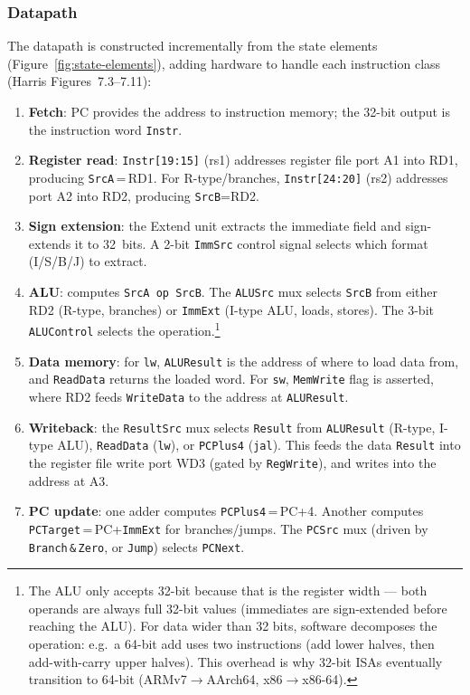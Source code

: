 \documentclass[9pt, a4paper]{extarticle}
\begin{document}
\subsubsection{Datapath} The datapath is constructed incrementally from the state elements (Figure~\ref{fig:state-elements}), adding hardware to handle each instruction class (Harris Figures~7.3--7.11):

\begin{enumerate}
    \item \textbf{Fetch}: PC provides the address to instruction memory; the 32-bit output is the instruction word \texttt{Instr}.
    \item \textbf{Register read}: \texttt{Instr[19:15]} (rs1) addresses register file port A1 into RD1, producing \texttt{SrcA}\,=\,RD1. For R-type/branches, \texttt{Instr[24:20]} (rs2) addresses port A2 into RD2, producing \texttt{SrcB}=RD2.
    \item \textbf{Sign extension}: the Extend unit extracts the immediate field and sign-extends it to 32~bits. A 2-bit \texttt{ImmSrc} control signal selects which format (I/S/B/J) to extract.
    \item \textbf{ALU}: computes \texttt{SrcA op SrcB}. The \texttt{ALUSrc} mux selects \texttt{SrcB} from either RD2 (R-type, branches) or \texttt{ImmExt} (I-type ALU, loads, stores). The 3-bit \texttt{ALUControl} selects the operation.\footnote{The ALU only accepts 32-bit because that is the register width --- both operands are always full 32-bit values (immediates are sign-extended before reaching the ALU). For data wider than 32 bits, software decomposes the operation: e.g.\ a 64-bit add uses two instructions (add lower halves, then add-with-carry upper halves). This overhead is why 32-bit ISAs eventually transition to 64-bit (ARMv7$\to$AArch64, x86$\to$x86-64).}
    \item \textbf{Data memory}: for \texttt{lw}, \texttt{ALUResult} is the address of where to load data from, and \texttt{ReadData} returns the loaded word. For \texttt{sw}, \texttt{MemWrite} flag is asserted, where RD2 feeds \texttt{WriteData} to the address at \texttt{ALUResult}.
    \item \textbf{Writeback}: the \texttt{ResultSrc} mux selects \texttt{Result} from \texttt{ALUResult} (R-type, I-type ALU), \texttt{ReadData} (\texttt{lw}), or \texttt{PCPlus4} (\texttt{jal}). This feeds the data \texttt{Result} into the register file write port WD3 (gated by \texttt{RegWrite}), and writes into the address at A3.
    \item \textbf{PC update}: one adder computes \texttt{PCPlus4}\,=\,PC+4. Another computes \texttt{PCTarget}\,=\,PC+\texttt{ImmExt} for branches/jumps. The \texttt{PCSrc} mux (driven by \texttt{Branch}\,\texttt{\&}\,\texttt{Zero}, or \texttt{Jump}) selects \texttt{PCNext}.
\end{enumerate}
\end{document}
